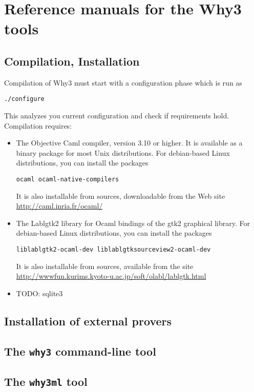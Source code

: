 \chapter{Reference manuals for the Why3 tools}
\label{chap:manpages}

\section{Compilation, Installation}

Compilation of Why3 must start with a configuration phase which is run as
\begin{verbatim}
./configure
\end{verbatim}
This analyzes you current configuration and check if requirements hold.
Compilation requires:
\begin{itemize}
\item The Objective Caml compiler, version 3.10 or higher. It is
  available as a binary package for most Unix distributions. For
  debian-based Linux distributions, you can install the packages
\begin{verbatim}
ocaml ocaml-native-compilers
\end{verbatim}
It is also installable from sources, downloadable from the Web site
\url{http://caml.inria.fr/ocaml/}

\item The Lablgtk2 library for Ocaml bindings of the gtk2 graphical library.
 For debian-based Linux distributions, you can install the packages
\begin{verbatim}
liblablgtk2-ocaml-dev liblablgtksourceview2-ocaml-dev
\end{verbatim}
It is also installable from sources, available from the site \url{http://wwwfun.kurims.kyoto-u.ac.jp/soft/olabl/lablgtk.html}

\item TODO: sqlite3
\end{itemize}

\section{Installation of external provers}

\section{The \texttt{why3} command-line tool}

\section{The \texttt{why3ml} tool}

